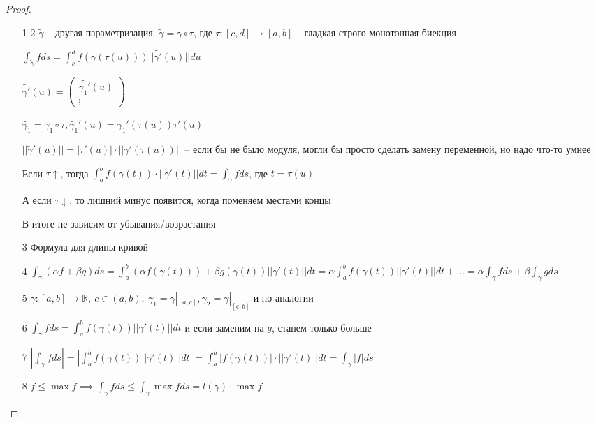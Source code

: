 \begin{proof}
    \begin{enumerate}
        \item[1-2] $\tilde{\gamma}$ -- другая параметризация. $\tilde{\gamma} = \gamma \circ \tau$, где $\tau: [c, d] \to [a, b]$ -- гладкая строго монотонная биекция

        $\int_{\tilde{\gamma}}^{}f ds = \int_{c}^{d}f(\gamma(\tau(u)))||\tilde{\gamma'}(u)||du$

        $\tilde{\gamma'}(u) = \begin{pmatrix}
            \tilde{\gamma_1'}(u) \\
            \vdots
        \end{pmatrix}$

        $\tilde{\gamma_1} = \gamma_1 \circ \tau, \tilde{\gamma_1}'(u) = \gamma_1'(\tau(u))\tau'(u)$

        $||\tilde{\gamma}'(u)|| = |\tau'(u)| \cdot ||\gamma'(\tau(u))||$ -- если бы не было модуля, могли бы просто сделать замену переменной, но надо что-то умнее

        Если $\tau \uparrow$, тогда $\int_{a}^{b}f(\gamma(t)) \cdot ||\gamma'(t)|| dt = \int_{\gamma}^{}f ds$, где $t = \tau(u)$

        А если $\tau \downarrow$, то лишний минус появится, когда поменяем местами концы

        В итоге не зависим от убывания/возрастания

        \item[3] Формула для длины кривой
        \item[4] $\int_{\gamma}^{}(\alpha f + \beta g)ds = \int_{a}^{b}(\alpha f(\gamma(t))) + \beta g(\gamma(t))||\gamma'(t)||dt = \alpha \int_{a}^{b}f(\gamma(t))||\gamma'(t)||dt + \dots = \alpha \int_{\gamma}^{}f ds + \beta\int_{\gamma}^{}gds$
        \item[5] $\gamma: [a, b] \to \mathbb{R},\ c \in (a, b),\ \gamma_1 = \gamma|_{[a, c]}, \gamma_2 = \gamma|_{[c, b]}$ и по аналогии
        \item[6] $\int_{\gamma}^{}f ds = \int_{a}^{b}f(\gamma(t))||\gamma'(t)||dt$ и если заменим на $g$, станем только больше
        \item[7] $|\int_{\gamma}^{}f ds| = |\int_{a}^{b}f(\gamma(t))||\gamma'(t)||dt| = \int_{a}^{b}|f(\gamma(t))| \cdot ||\gamma'(t)||dt = \int_{\gamma}^{}|f|ds$
        \item[8] $f \leq \max f \implies \int_{\gamma}^{}fds \leq \int_{\gamma}^{}\max f ds = l(\gamma) \cdot \max f$
    \end{enumerate}
\end{proof}

